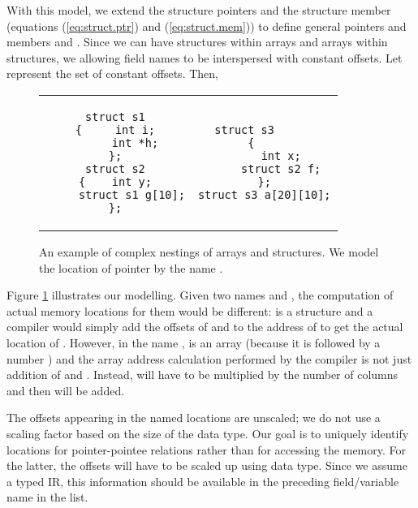 \documentclass[a4paper,11pt,fleqn]{article}
\begin{document}
With this model, we extend the structure pointers \structp and the structure member \structm
(equations (\ref{eq:struct.ptr}) and (\ref{eq:struct.mem})) to define
general pointers and members \genp and \genm. Since we can have
structures within arrays and arrays within structures, we allowing
field names to be interspersed with constant offsets.
Let  represent the set of constant offsets. Then,


\begin{figure}
\begin{center}
\begin{tabular}{c|c}
\begin{minipage}{50mm}
\begin{verbatim}
struct s1
{     int i;
      int *h;
};
struct s2
{    int y;
     struct s1 g[10];
};
\end{verbatim}
\end{minipage}
&
\begin{minipage}{50mm}
\begin{verbatim}
struct s3      
{    
     int x;
     struct s2 f;
};
struct s3 a[20][10];
\end{verbatim}
\end{minipage}
\end{tabular}
\end{center}
\caption{An example of complex nestings of arrays and structures. We model the location of pointer
\text{} by the name
\text{}. 
}
\label{fig:exmp.array.struct}
\end{figure}


Figure \ref{fig:exmp.array.struct} illustrates our modelling. Given two
names \text{} and \text{}, the computation of actual
memory locations for them would be different:  is a structure and a
compiler would simply add the offsets of  and  to the address of
 to get the actual location of \text{}. However, in the name
\text{},  is an array (because it is followed by a number
) and the array address calculation performed by the compiler is
not just addition of  and . Instead,  will have to be
multiplied by the number of columns and then  will be added.

The offsets appearing in the named locations  are unscaled; we do not use a scaling factor based on 
the size of the data type. Our goal is to uniquely identify locations for pointer-pointee relations
rather than for accessing the memory. For the latter, the offsets will have to be scaled up using data
type. Since we assume a typed IR, this information should be available in the preceding field/variable name
in the list.
\end{document}
